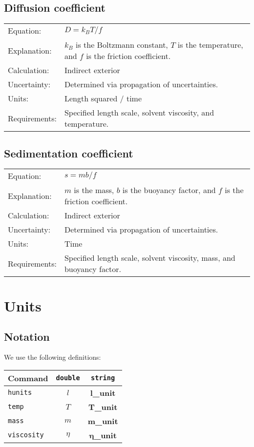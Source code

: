 \documentclass[12pt,letterpaper]{article}
\begin{document}
\subsection{Diffusion coefficient}
\begin{tabular}{p{1in} p{5.5in}}
Equation: & $D = k_{B}T/f$  \\
Explanation: &  $k_{B}$ is the Boltzmann constant, $T$ is the temperature, and $f$ is the friction coefficient.\\
Calculation: & Indirect exterior  \\
Uncertainty:& Determined via propagation of uncertainties.\\
Units: & Length squared / time \\
Requirements: & Specified length scale, solvent viscosity, and temperature.\\
\end{tabular}

\subsection{Sedimentation coefficient}
\begin{tabular}{p{1in} p{5.5in}}
Equation: & $s = mb/f$  \\
Explanation: &  $m$ is the mass, $b$ is the buoyancy factor, and $f$ is the friction coefficient.\\
Calculation: & Indirect exterior  \\
Uncertainty:& Determined via propagation of uncertainties.\\
Units: & Time \\
Requirements: & Specified length scale, solvent viscosity, mass, and buoyancy factor.\\
\end{tabular}

\section{Units}

\subsection{Notation}

We use the following definitions: \\
\begin{tabular}{| l | c | c |}
\hline Command & \texttt{double} & \texttt{string} \\
\hline\hline\texttt{hunits} & $l$ & \textbf{l\_unit} \\
\hline\texttt{temp} & $T$ & \textbf{T\_unit} \\
\hline\texttt{mass} & $m$ & \textbf{m\_unit} \\
\hline\texttt{viscosity} & $\eta$ & $\mathbf{\eta}$\textbf{\_unit} \\
\hline
\end{tabular}
\end{document}
